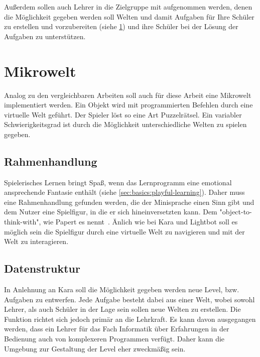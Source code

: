Außerdem sollen auch Lehrer in die Zielgruppe mit aufgenommen werden, denen die Möglichkeit gegeben werden soll Welten und damit Aufgaben für Ihre Schüler zu erstellen und vorzubereiten (siehe \ref{sec:requirements:world}) und ihre Schüler bei der Lösung der Aufgaben zu unterstützen.

\section{Mikrowelt}
\label{sec:requirements:world}

Analog zu den vergleichbaren Arbeiten soll auch für diese Arbeit eine Mikrowelt implementiert werden. Ein Objekt wird mit programmierten Befehlen durch eine virtuelle Welt geführt. Der Spieler löst so eine Art Puzzelrätsel. Ein variabler Schwierigkeitsgrad ist durch die Möglichkeit unterschiedliche Welten zu spielen gegeben.

\subsection{Rahmenhandlung}
\label{sec:requirements:world:story}

Spielerisches Lernen bringt Spaß, wenn das Lernprogramm eine emotional ansprechende Fantasie enthält (siehe \ref{sec:basics:playful-learning}). Daher muss eine Rahmenhandlung gefunden werden, die der Minisprache einen Sinn gibt und dem Nutzer eine Spielfigur, in die er sich hineinversetzten kann. Dem "object-to-think-with", wie Papert es nennt~\cite[11]{papert1980}. Änlich wie bei Kara und Lightbot soll es möglich sein die Spielfigur durch eine virtuelle Welt zu navigieren und mit der Welt zu interagieren.

\subsection{Datenstruktur}
\label{sec:requirements:world:structure}

In Anlehnung an Kara soll die Möglichkeit gegeben werden neue Level, bzw. Aufgaben zu entwerfen. Jede Aufgabe besteht dabei aus einer Welt, wobei sowohl Lehrer, als auch Schüler in der Lage sein sollen neue Welten zu erstellen. Die Funktion richtet sich jedoch primär an die Lehrkraft. Es kann davon ausgegangen werden, dass ein Lehrer für das Fach Informatik über Erfahrungen in der Bedienung auch von komplexeren Programmen verfügt. Daher kann die Umgebung zur Gestaltung der Level eher zweckmäßig sein.

